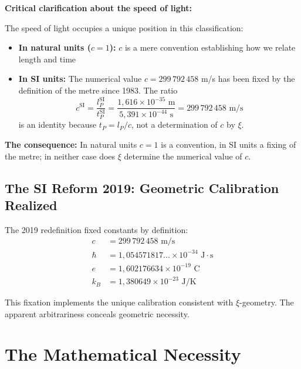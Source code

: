 	\begin{warning}
		\textbf{Critical clarification about the speed of light:}
		
		The speed of light occupies a unique position in this classification:
		
		\begin{itemize}
			\item \textbf{In natural units ($c = 1$):} $c$ is a mere convention establishing how we relate length and time
			
			\item \textbf{In SI units:} The numerical value $c = 299\,792\,458$ m/s has been fixed by the definition of the metre since 1983. The ratio
			\begin{equation}
				c^{\text{SI}} = \frac{l_P^{\text{SI}}}{t_P^{\text{SI}}} = \frac{1{,}616 \times 10^{-35} \text{ m}}{5{,}391 \times 10^{-44} \text{ s}} = 299\,792\,458 \text{ m/s}
			\end{equation}
			is an identity because $t_P = l_P/c$, not a determination of $c$ by $\xi$.
		\end{itemize}
		
		\textbf{The consequence:} In natural units $c = 1$ is a convention, in SI units a fixing of the metre; in neither case does $\xi$ determine the numerical value of $c$.
	\end{warning}
	
	\subsection{The SI Reform 2019: Geometric Calibration Realized}
	
	The 2019 redefinition fixed constants by definition:
	\begin{align}
		c &= 299\,792\,458 \text{ m/s} \\
		\hbar &= 1{,}054571817... \times 10^{-34} \text{ J}\cdot\text{s} \\
		e &= 1{,}602176634 \times 10^{-19} \text{ C} \\
		k_B &= 1{,}380649 \times 10^{-23} \text{ J/K}
	\end{align}
	
	\begin{insight}
		This fixation implements the unique calibration consistent with $\xi$-geometry. The apparent arbitrariness conceals geometric necessity.
	\end{insight}
	
	\section{The Mathematical Necessity}
	
